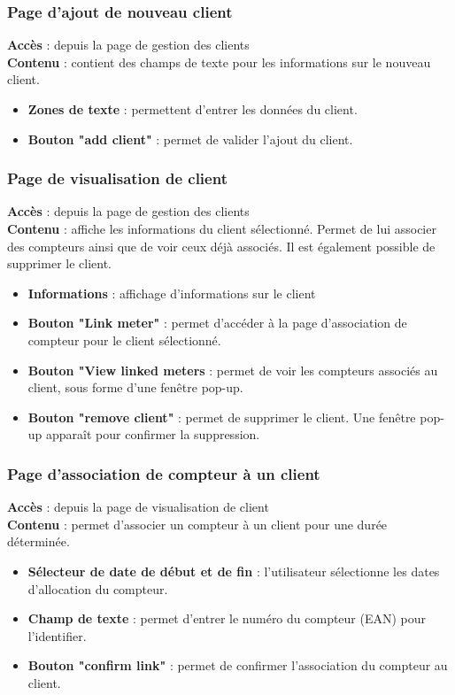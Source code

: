 \documentclass[../rapport.tex]{subfiles}
\begin{document}
\subsubsection{Page d'ajout de nouveau client}
\noindent \textbf{Accès} :  depuis la page de gestion des clients\\
\textbf{Contenu }: contient des champs de texte pour les informations sur le nouveau client.
\begin{itemize}
    \item \textbf{Zones de texte} : permettent d'entrer les données du client.
    \item \textbf{Bouton "add client"} : permet de valider l'ajout du client.
\end{itemize}

\subsubsection{Page de visualisation de client}
\noindent \textbf{Accès} :  depuis la page de gestion des clients\\
\textbf{Contenu }: affiche les informations du client sélectionné. Permet de lui associer des compteurs ainsi que de voir ceux déjà associés. Il est également possible de supprimer le client.
\begin{itemize}
    \item \textbf{Informations} : affichage d'informations sur le client
    \item \textbf{Bouton "Link meter"} : permet d'accéder à la page d'association de compteur pour le client sélectionné.
    \item \textbf{Bouton "View linked meters} : permet de voir les compteurs associés au client, sous forme d'une fenêtre pop-up.
    \item \textbf{Bouton "remove client"} : permet de supprimer le client. Une fenêtre pop-up apparaît pour confirmer la suppression.
\end{itemize}


\subsubsection{Page d'association de compteur à un client}
\noindent \textbf{Accès} :  depuis la page de visualisation de client\\
\textbf{Contenu }: permet d'associer un compteur à un client pour une durée déterminée.
\begin{itemize}
    \item \textbf{Sélecteur de date de début et de fin} : l'utilisateur sélectionne les dates d'allocation du compteur.
    \item \textbf{Champ de texte} : permet d'entrer le numéro du compteur (EAN) pour l'identifier.
    \item \textbf{Bouton "confirm link"} : permet de confirmer l'association du compteur au client.
\end{itemize}
\end{document}

